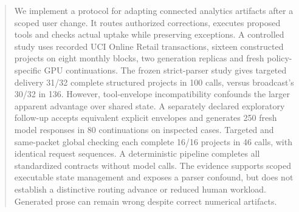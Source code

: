 \begin{abstract}
We implement a protocol for adapting connected analytics artifacts after a scoped user change. It routes authorized corrections, executes proposed tools and checks actual uptake while preserving exceptions. A controlled study uses recorded UCI Online Retail transactions, sixteen constructed projects on eight monthly blocks, two generation replicas and fresh policy-specific GPU continuations. The frozen strict-parser study gives targeted delivery 31/32 complete structured projects in 100 calls, versus broadcast's 30/32 in 136. However, tool-envelope incompatibility confounds the larger apparent advantage over shared state. A separately declared exploratory follow-up accepts equivalent explicit envelopes and generates 250 fresh model responses in 80 continuations on inspected cases. Targeted and same-packet global checking each complete 16/16 projects in 46 calls, with identical request sequences. A deterministic pipeline completes all standardized contracts without model calls. The evidence supports scoped executable state management and exposes a parser confound, but does not establish a distinctive routing advance or reduced human workload. Generated prose can remain wrong despite correct numerical artifacts.
\end{abstract}
